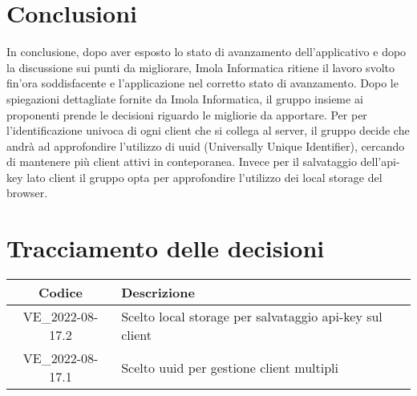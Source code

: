 \section{Conclusioni}
In conclusione, dopo aver esposto lo stato di avanzamento dell'applicativo e dopo la discussione sui punti da migliorare, Imola Informatica ritiene il lavoro svolto fin'ora soddisfacente e l'applicazione nel corretto stato di avanzamento. Dopo le spiegazioni dettagliate fornite da Imola Informatica, il gruppo insieme ai proponenti prende le decisioni riguardo le migliorie da apportare. Per per l'identificazione univoca di ogni client che si collega al server, il gruppo decide che andrà ad approfondire l'utilizzo di uuid (Universally Unique Identifier), cercando di mantenere più client attivi in conteporanea. Invece per il salvataggio dell'api-key lato client il gruppo opta per approfondire l'utilizzo dei local storage del browser. 
\newpage

\section*{Tracciamento delle decisioni}
	\renewcommand{\arraystretch}{1.8} %
	\begin{tabular}{ |c|l| }
		\hline
		\textbf{Codice} & \textbf{Descrizione} \\
		\hline
		VE\_2022-08-17.2 & Scelto local storage per salvataggio api-key sul client\\
		\hline
		VE\_2022-08-17.1 & Scelto uuid per gestione client multipli \\
		\hline
	\end{tabular}